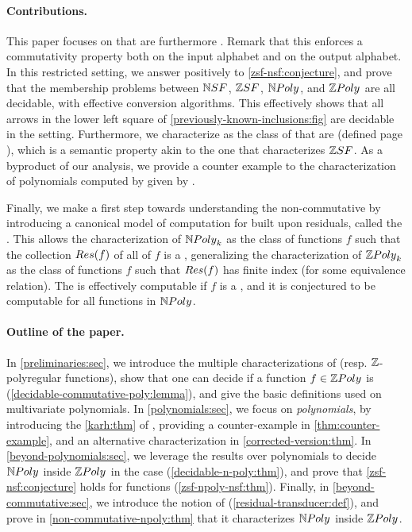 \paragraph*{Contributions.} This paper focuses on  that are furthermore . Remark that this enforces a
commutativity property both on the input alphabet and on the output alphabet.
In this restricted setting, we answer positively to \cref{zsf-nsf:conjecture},
and prove that the membership problems between $\NSF$, $\ZSF$, $\NPoly$, and
$\ZPoly$ are all decidable, with effective conversion algorithms. This
effectively shows that all arrows in the lower left square of
\cref{previously-known-inclusions:fig} are decidable in the 
setting. Furthermore, we characterize   as the class of  that are
 (defined page ), which is a semantic
property akin to the one  that characterizes $\ZSF$.
As a byproduct of our analysis, we provide a counter example to the
characterization of polynomials computed by  given
by \textcite[Theorem 3.3, page 4; re-introduced as \cref{karh:thm}]{KARH77}.

Finally, we make a first step towards understanding the non-commutative by
introducing a canonical model of computation for  built upon residuals, called the . This
allows the characterization of $\NPoly[k]$ as the class of functions $f$ such
that the collection $\Res(f)$ of all  of $f$ is a
, generalizing the characterization of $\ZPoly[k]$ as
the class of functions $f$ such that $\Res(f)$ has finite index (for some
equivalence relation). The  is effectively computable
if $f$ is a  , and it is
conjectured to be computable for all functions in $\NPoly$. 


\paragraph*{Outline of the paper.} In \cref{preliminaries:sec}, we introduce
the multiple characterizations of  (resp.
$\mathbb{Z}$-polyregular functions), show that one can decide if a function $f \in
\ZPoly$ is  (\cref{decidable-commutative-poly:lemma}), and give the
basic definitions used on multivariate polynomials. In \cref{polynomials:sec},
we focus on \emph{polynomials}, by introducing the \cref{karh:thm} of
\textcite{KARH77}, providing a counter-example in \cref{thm:counter-example},
and an alternative characterization in \cref{corrected-version:thm}. In
\cref{beyond-polynomials:sec}, we leverage the results over polynomials to
decide $\NPoly$ inside $\ZPoly$ in the  case
(\cref{decidable-n-poly:thm}), and prove that \cref{zsf-nsf:conjecture} holds
for  functions (\cref{zsf-npoly-nsf:thm}). Finally, in
\cref{beyond-commutative:sec}, we introduce the notion of  (\cref{residual-transducer:def}), and prove in
\cref{non-commutative-npoly:thm} that it characterizes $\NPoly$ inside
$\ZPoly$.
